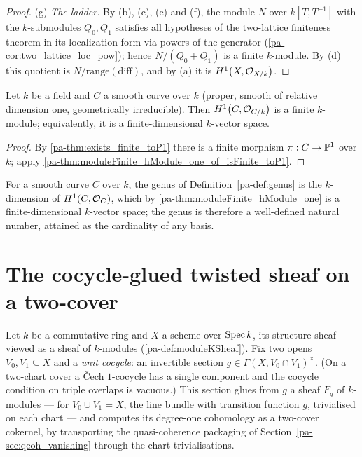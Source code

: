 \begin{proof}
  (g) \emph{The ladder.} By (b), (c), (e) and (f), the module \(N\) over
  \(k[T,T^{-1}]\) with the \(k\)-submodules \(Q_0, Q_1\) satisfies all hypotheses of the
  two-lattice finiteness theorem in its localization form via powers of the generator
  (\ref{pa-cor:two_lattice_loc_pow}); hence \(N/(Q_0 + Q_1)\) is a finite \(k\)-module. By
  (d) this quotient is \(N/\mathrm{range}(\mathrm{diff})\), and by (a) it is
  \(H^1\bigl(X, \mathcal{O}_{X/k}\bigr)\).
\end{proof}

\begin{theorem}
  \label{pa-thm:moduleFinite_hModule_one}
  \leanok

  Let \(k\) be a field and \(C\) a smooth curve over \(k\) (proper, smooth of relative
  dimension one, geometrically irreducible). Then
  \(H^1\bigl(C, \mathcal{O}_{C/k}\bigr)\) is a finite \(k\)-module; equivalently, it is a
  finite-dimensional \(k\)-vector space.
\end{theorem}
\begin{proof}
  \leanok
  By \ref{pa-thm:exists_finite_toP1} there is a finite morphism \(\pi : C \to \mathbb{P}^1\) over
  \(k\); apply \ref{pa-thm:moduleFinite_hModule_one_of_isFinite_toP1}.
\end{proof}

\begin{remark}
  \label{pa-rem:genus_finite}
  For a smooth curve \(C\) over \(k\), the genus of Definition~\ref{pa-def:genus} is the
  \(k\)-dimension of \(H^1(C, \mathcal{O}_{C})\), which by
  \ref{pa-thm:moduleFinite_hModule_one} is a finite-dimensional \(k\)-vector space; the
  genus is therefore a well-defined natural number, attained as the cardinality of any
  basis.
\end{remark}

\section{The cocycle-glued twisted sheaf on a two-cover}
\label{pa-sec:twisted_sheaf}

Let \(k\) be a commutative ring and \(X\) a scheme over \(\operatorname{Spec} k\), its structure sheaf
viewed as a sheaf of \(k\)-modules (\ref{pa-def:moduleKSheaf}). Fix two opens
\(V_0, V_1 \subseteq X\) and a \emph{unit cocycle}: an invertible section
\(g \in \Gamma(X, V_0 \cap V_1)^{\times}\). (On a two-chart cover a \v{C}ech
\(1\)-cocycle has a single component and the cocycle condition on triple overlaps is
vacuous.) This section glues from \(g\) a sheaf \(F_g\) of \(k\)-modules --- for
\(V_0 \cup V_1 = X\), the line bundle with transition function \(g\), trivialised on each
chart --- and computes its degree-one cohomology as a two-cover cokernel, by transporting
the quasi-coherence packaging of Section~\ref{pa-sec:qcoh_vanishing} through the chart
trivialisations.

